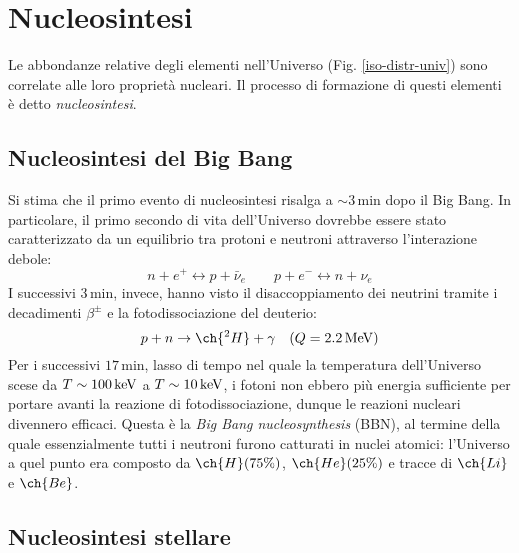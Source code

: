 
\section{Nucleosintesi}

Le abbondanze relative degli elementi nell'Universo (Fig. \ref{iso-distr-univ}) sono correlate alle loro proprietà nucleari. Il processo di formazione di questi elementi è detto \textit{nucleosintesi}.

\subsection{Nucleosintesi del Big Bang}

Si stima che il primo evento di nucleosintesi risalga a $ \sim 3\,\text{min} $ dopo il Big Bang. In particolare, il primo secondo di vita dell'Universo dovrebbe essere stato caratterizzato da un equilibrio tra protoni e neutroni attraverso l'interazione debole:
\begin{equation*}
	n + e^+ \leftrightarrow p + \bar{\nu}_e
	\qquad
	p + e^- \leftrightarrow n + \nu_e
\end{equation*}
I successivi $ 3\,\text{min} $, invece, hanno visto il disaccoppiamento dei neutrini tramite i decadimenti $ \beta^{\pm} $ e la fotodissociazione del deuterio:
\begin{equation*}
	p + n \rightarrow \ch{^2 H} + \gamma \quad (Q = 2.2 \mev)
\end{equation*}
Per i successivi $ 17\,\text{min} $, lasso di tempo nel quale la temperatura dell'Universo scese da $ T \sim 100 \,\mathrm{keV} $ a $ T \sim 10\,\mathrm{keV} $, i fotoni non ebbero più energia sufficiente per portare avanti la reazione di fotodissociazione, dunque le reazioni nucleari divennero efficaci. Questa è la \textit{Big Bang nucleosynthesis} (BBN), al termine della quale essenzialmente tutti i neutroni furono catturati in nuclei atomici: l'Universo a quel punto era composto da $ \ch{H} (75\%) $, $ \ch{He} (25\%) $ e tracce di $ \ch{Li} $ e $ \ch{Be} $.

\subsection{Nucleosintesi stellare}

